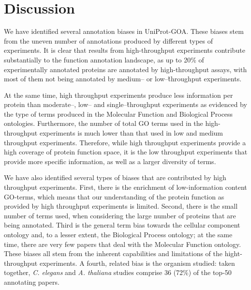\documentclass[12pt]{article}
\begin{document}
% 
% 
% 


\section*{Discussion}

We have identified several annotation biases in UniProt-GOA. These biases stem from the
uneven number of annotations produced by different types of experiments. It is clear that
results from high-throughput experiments contribute substantially to the function annotation
landscape, as up to 20\% of experimentally annotated proteins are annotated by
high-throughput assays, with most of them not being annotated by medium-- or
low--\~throughput experiments. 

At the same time, high throughput experiments produce less information per protein than
moderate--, low-- and single--\~throughput experiments as evidenced by the type of terms
produced in the Molecular Function and Biological Process ontologies. Furthermore, the
number of total GO terms used in the high-throughput experiments is much lower than that
used in low and medium throughput experiments. Therefore, while high throughput experiments
provide a high coverage of protein function space, it is the low throughput
experiments that provide more specific information, as well as a larger diversity of terms.

We have also identified several types of biases that are contributed by high throughput experiments.
First, there is the enrichment of low-information content GO-terms, which means that our
understanding of the protein function as provided by high throughput experiments is limited.
Second, there is the small number of terms used, when considering the large number of proteins that
are being annotated. Third is the general term bias towards the cellular component ontology and, to
a lesser extent, the Biological Process ontology; at the same time, there are very few papers that
deal with the Molecular Function ontology.  These biases all stem from the inherent
capabilities and limitations of the hight-throughput experiments.  A fourth, related bias is the
organism studied: taken together, \textit{C. elegans} and \textit{A. thaliana} studies comprise 36
(72\%) of the top-50 annotating papers. 
\end{document}
